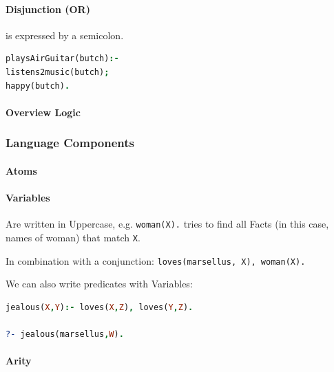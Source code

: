 \paragraph{Disjunction (OR)}

is expressed by a semicolon.
\begin{lstlisting}[language=Prolog]
playsAirGuitar(butch):-
listens2music(butch);
happy(butch).
\end{lstlisting}

\paragraph{Overview Logic}


\subsubsection{Language Components}

\paragraph{Atoms}


\paragraph{Variables}


Are written in Uppercase, e.g. \lstinline|woman(X).| tries to find all Facts (in this case, names of woman) that match \lstinline|X|.

In combination with a conjunction: \lstinline|loves(marsellus, X), woman(X).|

We can also write predicates with Variables: 
\begin{lstlisting}[language=Prolog]
jealous(X,Y):- loves(X,Z), loves(Y,Z).

?- jealous(marsellus,W).
\end{lstlisting}

\paragraph{Arity}

